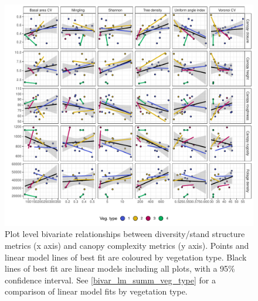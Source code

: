\documentclass[11pt,a4paper]{article}
\begin{document}
\begin{figure}
	\includegraphics[width=\linewidth]{bivar_plot}
	\caption[Bivariate plots comparing diversity, stand structure and canopy complexity]{Plot level bivariate relationships between diversity/stand structure metrics (x axis) and canopy complexity metrics (y axis). Points and linear model lines of best fit are coloured by vegetation type. Black lines of best fit are linear models including all plots, with a 95\% confidence interval. See \autoref{bivar_lm_summ_veg_type} for a comparison of linear model fits by vegetation type.}
	\label{plot_bivar}
\end{figure}
\end{document}
